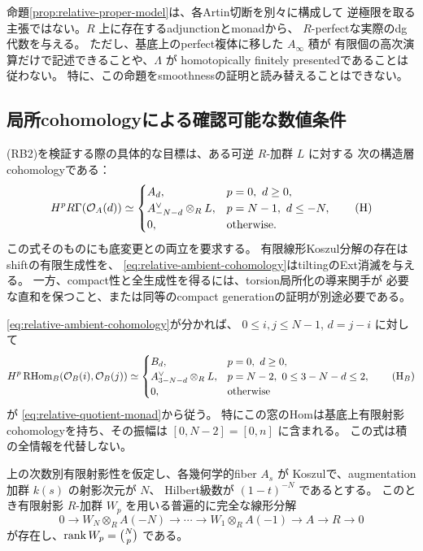 \begin{remark}[有限性の範囲]\label{rem:relative-model-finiteness}
 命題\ref{prop:relative-proper-model}は、各Artin切断を別々に構成して
 逆極限を取る主張ではない。\(R\) 上に存在するadjunctionとmonadから、
 \(R\)-perfectな実際のdg代数を与える。
 ただし、基底上のperfect複体に移した \(A_\infty\) 積が
 有限個の高次演算だけで記述できることや、\(\Lambda\) が
 homotopically finitely presentedであることは従わない。
 特に、この命題をsmoothnessの証明と読み替えることはできない。
\end{remark}

\subsection{局所cohomologyによる確認可能な数値条件}

(RB2)を検証する際の具体的な目標は、ある可逆 \(R\)-加群 \(L\) に対する
次の構造層cohomologyである：
\[
 H^pR\Gamma(\mathcal O_A(d))\simeq
 \begin{cases}
 A_d,&p=0,\ d\ge0,\\
 A_{-N-d}^{\vee}\otimes_RL,&p=N-1,\ d\le-N,\\
 0,&\text{otherwise}.
 \end{cases}
 \tag{H}\label{eq:relative-ambient-cohomology}
\]
この式そのものにも底変更との両立を要求する。
有限線形Koszul分解の存在はshiftの有限生成性を、
\eqref{eq:relative-ambient-cohomology}はtiltingのExt消滅を与える。
一方、compact性と全生成性を得るには、torsion局所化の導来関手が
必要な直和を保つこと、または同等のcompact generationの証明が別途必要である。

\eqref{eq:relative-ambient-cohomology}が分かれば、
\(0\le i,j\le N-1\), \(d=j-i\) に対して
\[
 H^p\operatorname{RHom}_B(\mathcal O_B(i),\mathcal O_B(j))\simeq
 \begin{cases}
 B_d,&p=0,\ d\ge0,\\
 A_{3-N-d}^{\vee}\otimes_RL,
     &p=N-2,\ 0\le3-N-d\le2,\\
 0,&\text{otherwise}
 \end{cases}
 \tag{H$_B$}\label{eq:relative-hypersurface-cohomology}
\]
が \eqref{eq:relative-quotient-monad}から従う。
特にこの窓のHomは基底上有限射影cohomologyを持ち、その振幅は
\([0,N-2]=[0,n]\) に含まれる。
この式は積の全情報を代替しない。

\begin{lemma}
\label{lem:relative-koszul-resolution}
 上の次数別有限射影性を仮定し、各幾何学的fiber \(A_s\) が
 Koszulで、augmentation加群 \(k(s)\) の射影次元が \(N\)、
 Hilbert級数が \((1-t)^{-N}\) であるとする。
 このとき有限射影 \(R\)-加群 \(W_p\) を用いる普遍的に完全な線形分解
 \[
 0\to W_N\otimes_RA(-N)\to\cdots\to
 W_1\otimes_RA(-1)\to A\to R\to0
 \tag{K}\label{eq:relative-linear-resolution}
 \]
 が存在し、\(\operatorname{rank} W_p=\binom Np\) である。
\end{lemma}

